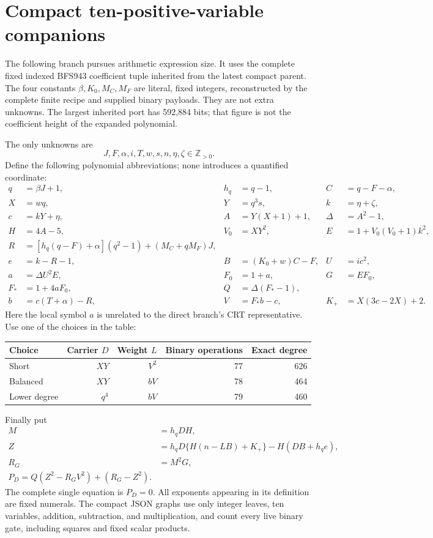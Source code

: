 \documentclass[11pt,letterpaper]{article}
\theoremstyle{definition}\newtheorem{definition}[theorem]{Definition}
\theoremstyle{remark}\newtheorem{remark}[theorem]{Remark}
\newcommand{\Pos}{\ensuremath{\mathbb Z_{>0}}}
\begin{document}
\section{Compact ten-positive-variable companions}\label{sec:compact}

The following branch pursues arithmetic expression size. It uses the complete fixed indexed BFS943 coefficient tuple inherited from the latest compact parent. The four constants \(\beta,K_0,M_C,M_F\) are literal, fixed integers, reconstructed by the complete finite recipe and supplied binary payloads. They are not extra unknowns. The largest inherited port has 592,884 bits; that figure is not the coefficient height of the expanded polynomial.

The only unknowns are
\[
 J,F,\alpha,i,T,w,s,n,\eta,\zeta\in\Pos.
\]
Define the following polynomial abbreviations; none introduces a quantified coordinate:
\begin{align*}
 q&=\beta J+1,& h_q&=q-1,& C&=q-F-\alpha,\\
 X&=wq,&Y&=q^3s,& k&=\eta+\zeta,\\
 c&=kY+\eta,& A&=Y(X+1)+1,&\Delta&=A^2-1,\\
 H&=4A-5,& V_0&=XY^2,&E&=1+V_0(V_0+1)k^2,\\
 R&=[h_q(q-F)+\alpha](q^2-1)+(M_C+qM_F)J,\\
 e&=k-R-1,& B&=(K_0+w)C-F,&U&=ic^2,\\
 a&=\Delta U^2E,&F_0&=1+a,&G&=EF_0,\\
 F_*&=1+4aF_0,& Q&=\Delta(F_*-1),\\
 b&=c(T+\alpha)-R,&V&=F_*b-c,&K_+&=X(3c-2X)+2.
\end{align*}
Here the local symbol \(a\) is unrelated to the direct branch's CRT representative. Use one of the choices in the table:
\begin{center}
\begin{tabular}{lrrrr}
\toprule
Choice & Carrier \(D\)&Weight \(L\)&Binary operations&Exact degree\\
\midrule
Short &\(XY\)&\(V^2\)&77&626\\
Balanced &\(XY\)&\(bV\)&78&464\\
Lower degree &\(q^4\)&\(bV\)&79&460\\
\bottomrule
\end{tabular}
\end{center}
Finally put
\begin{align}
 M&=h_qDH,\\
 Z&=h_qD\{H(n-LB)+K_+\}-H(DB+h_qe),\label{eq:z}\\
 R_G&=M^2G,\\
 \boxed{P_D=Q(Z^2-R_GV^2)+(R_G-Z^2).}\label{eq:compact}
\end{align}
The complete single equation is \(P_D=0\). All exponents appearing in its definition are fixed numerals. The compact JSON graphs use only integer leaves, ten variables, addition, subtraction, and multiplication, and count every live binary gate, including squares and fixed scalar products.
\end{document}
